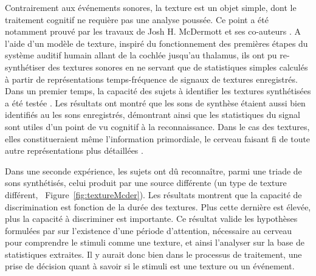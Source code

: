 Contrairement aux événements sonores, la texture est un objet simple, dont le traitement cognitif ne requière pas une analyse poussée. Ce point a été notamment prouvé par les travaux de Josh H. McDermott et ses co-auteurs \citep{mcdermott2011sound,mcdermott2013summary}. A l'aide d'un modèle de texture, inspiré du fonctionnement des premières étapes du système auditif humain allant de la cochlée jusqu'au thalamus, ils ont pu re-synthétiser des textures sonores en ne servant que de statistiques simples calculés à partir de représentations temps-fréquence de signaux de textures enregistrés. Dans un premier temps, la capacité des sujets à identifier les textures synthétisées a été testée \citep{mcdermott2011sound}. Les résultats ont montré que les sons de synthèse étaient aussi bien identifiés au les sons enregistrés, démontrant ainsi que les statistiques du signal sont utiles d'un point de vu cognitif à la reconnaissance. Dans le cas des textures, elles constitueraient même l'information primordiale, le cerveau faisant fi de toute autre représentations plus détaillées \citep{nelken2013ear}.

Dans une seconde expérience, \citep{mcdermott2013summary} les sujets ont dû reconnaître, parmi une triade de sons synthétisés, celui produit par une source différente (\ie un type de texture différent, \Cf~Figure~\ref{fig:textureMcder}). Les résultats montrent que la capacité de discrimination est fonction de la durée des textures. Plus cette dernière est élevée, plus la capacité à discriminer est importante.  Ce résultat valide les hypothèses formulées par \citep{saint1995classification} sur l'existence d'une période d'attention, nécessaire au cerveau pour comprendre le stimuli comme une texture, et ainsi l'analyser sur la base de statistiques extraites. Il y aurait donc bien dans le processus de traitement, une prise de décision quant à savoir si le stimuli est une texture ou un événement.

